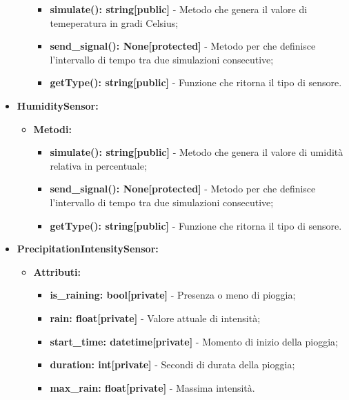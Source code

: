 \documentclass[8pt]{article}
\begin{document}
\begin{itemize}
\begin{itemize}
        \begin{itemize}
	\setlength\itemsep{0em}
            \item \textbf{simulate(): string[public]} - Metodo che genera il valore di temeperatura in gradi Celsius;
            \item \textbf{send\_signal(): None[protected]} - Metodo per che definisce l'intervallo di tempo tra due simulazioni consecutive;
            \item \textbf{getType(): string[public]} - Funzione che ritorna il tipo di sensore.
        \end{itemize}
    \end{itemize}
    \item \textbf{HumiditySensor:}
    \begin{itemize}
	\setlength\itemsep{0em}
        \item \textbf{Metodi:}
        \begin{itemize}
	\setlength\itemsep{0em}
            \item \textbf{simulate(): string[public]} - Metodo che genera il valore di umidità relativa in percentuale;
            \item \textbf{send\_signal(): None[protected]} - Metodo per che definisce l'intervallo di tempo tra due simulazioni consecutive;
            \item \textbf{getType(): string[public]} - Funzione che ritorna il tipo di sensore.
        \end{itemize}
    \end{itemize}
    \item \textbf{PrecipitationIntensitySensor:}
    \begin{itemize}
	\setlength\itemsep{0em}
        \item \textbf{Attributi:}
        \begin{itemize}
	\setlength\itemsep{0em}
            \item \textbf{is\_raining: bool[private]} - Presenza o meno di pioggia;
            \item \textbf{rain: float[private]} - Valore attuale di intensità;
            \item \textbf{start\_time: datetime[private]} - Momento di inizio della pioggia;
            \item \textbf{duration: int[private]} - Secondi di durata della pioggia;
            \item \textbf{max\_rain: float[private]} - Massima intensità.
        \end{itemize}

\end{itemize}
\end{itemize}
\end{document}
